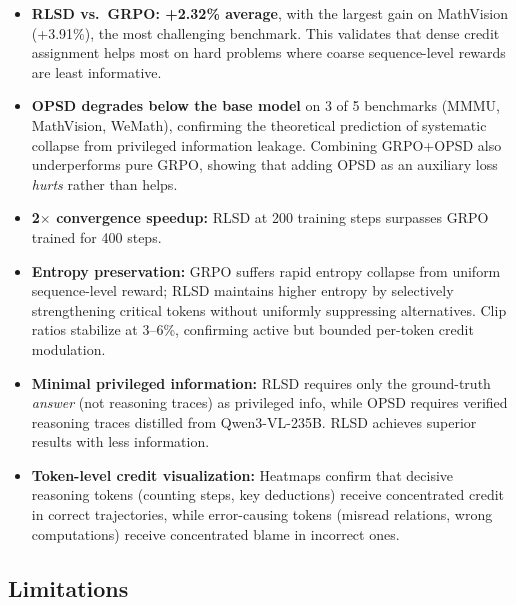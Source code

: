 \documentclass[11pt]{article}
\begin{document}
\begin{itemize}
    \item \textbf{RLSD vs.\ GRPO: +2.32\% average}, with the largest gain on MathVision (+3.91\%), the most challenging benchmark. This validates that dense credit assignment helps most on hard problems where coarse sequence-level rewards are least informative.

    \item \textbf{OPSD degrades below the base model} on 3 of 5 benchmarks (MMMU, MathVision, WeMath), confirming the theoretical prediction of systematic collapse from privileged information leakage. Combining GRPO+OPSD also underperforms pure GRPO, showing that adding OPSD as an auxiliary loss \textit{hurts} rather than helps.

    \item \textbf{2$\times$ convergence speedup:} RLSD at 200 training steps surpasses GRPO trained for 400 steps.

    \item \textbf{Entropy preservation:} GRPO suffers rapid entropy collapse from uniform sequence-level reward; RLSD maintains higher entropy by selectively strengthening critical tokens without uniformly suppressing alternatives. Clip ratios stabilize at 3--6\%, confirming active but bounded per-token credit modulation.

    \item \textbf{Minimal privileged information:} RLSD requires only the ground-truth \textit{answer} (not reasoning traces) as privileged info, while OPSD requires verified reasoning traces distilled from Qwen3-VL-235B. RLSD achieves superior results with less information.

    \item \textbf{Token-level credit visualization:} Heatmaps confirm that decisive reasoning tokens (counting steps, key deductions) receive concentrated credit in correct trajectories, while error-causing tokens (misread relations, wrong computations) receive concentrated blame in incorrect ones.
\end{itemize}

\subsection{Limitations}
\end{document}
